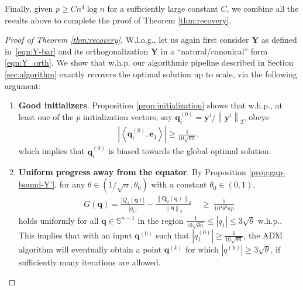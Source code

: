 \documentclass[11pt, journal, final]{IEEEtran}
\numberwithin{equation}{section}
\newcommand{\mb}{\mathbf}
\newcommand{\bb}{\mathbb}
\newcommand{\norm}[1]{\left\lVert#1\right\rVert}
\newcommand{\ol}{\overline}
\newcommand{ \abs }[1]{\left| #1 \right|}
\newcommand{\innerprod}[2]{\left\langle #1,  #2 \right\rangle}
\begin{document}
{Finally, given $p \ge Cn^4 \log n$ for a sufficiently large constant $C$, we combine all the results above to complete the proof of Theorem \ref{thm:recovery}.

\begin{proof}[Proof of Theorem \ref{thm:recovery}]

W.l.o.g., let us again first consider $\ol{\mb Y}$ as defined in~\eqref{eqn:Y-bar} and its orthogonalization $\mb Y$ in a ``natural/canonical'' form \eqref{eqn:Y_orth}. We show that w.h.p. our algorithmic pipeline described in Section \ref{sec:algorithm} exactly recovers the optimal solution up to scale, via the following argument:
\begin{enumerate}
\item \textbf{Good initializers}. Proposition \ref{prop:initialization} shows that w.h.p., at least one of the $p$ initialization vectors, say $\mb q_i^{(0)} = \mb y^i/\norm{\mb y^i}_2 $, obeys
\begin{align*}
\abs{\innerprod{ \mb q_i^{(0)} }{\mb e_1}} \ge \frac{1}{10\sqrt{\theta n}},
\end{align*}
which implies that $\mb q_i^{(0)}$ is biased towards the global optimal solution.

\item \textbf{Uniform progress away from the equator}. By Proposition \ref{prop:gap-bound-Y'}, for any $\theta \in (1/\sqrt{n}, \theta_0)$  with a constant $\theta_0 \in (0, 1)$,
\begin{align}\label{eqn:gap-main}
G(\mb q) = \frac{\abs{Q_1(\mb q)}}{\abs{q_1}} - \frac{\norm{\mb Q_2(\mb q)}_2}{\norm{\mb q}_2}\;&\geq \;\frac{1}{10^4\theta^2 np }
\end{align}
holds uniformly for all $\mb q\in \bb S^{n-1}$ in the region $\frac{1}{10\sqrt{\theta n}} \leq \abs{q_1} \leq 3 \sqrt{\theta}$ w.h.p.. This implies that with an input $\mb q^{(0)}$ such that $\abs{q_1^{(0)} }\geq \frac{1}{10 \sqrt{\theta n} } $, the ADM algorithm will eventually obtain a point $\mb q^{(k)}$ for which $\abs{q^{(k)} } \geq 3\sqrt{\theta}$, if sufficiently many iterations are allowed.


\end{enumerate}
\end{proof}}
\end{document}

